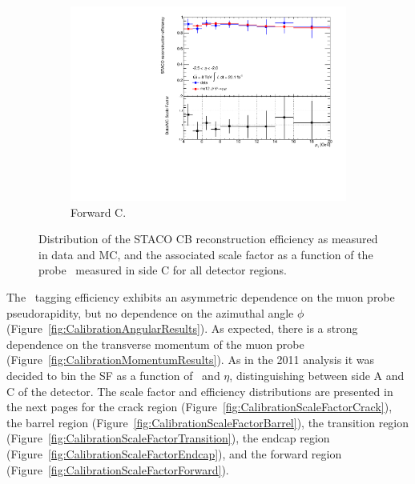 \begin{figure}[htbp]
    \begin{subfigure}[b]{0.45\textwidth}
      \includegraphics[width=\textwidth]{PartCalibration2012/Plots/SFPlots/Forward_C_reco.pdf}
      \caption{Forward C.}\label{fig:CalibrationRecoSFForwardC}
    \end{subfigure}
    \caption{Distribution of the STACO CB reconstruction efficiency as measured in data and MC, and the associated scale factor as a function of the probe \pt\ measured in side C for all detector regions.}\label{fig:RecoEffSideC}
\end{figure}

The \xsm\ tagging efficiency exhibits an asymmetric dependence on the muon probe pseudorapidity, but no dependence on the azimuthal angle $\phi$ (Figure~\ref{fig:CalibrationAngularResults}). As expected, there is a strong dependence on the transverse momentum of the muon probe (Figure~\ref{fig:CalibrationMomentumResults}). As in the 2011 analysis it was decided to bin the SF as a function of \pt\ and $\eta$, distinguishing between side A and C of the detector. The scale factor and efficiency distributions are presented in the next pages for the crack region (Figure~\ref{fig:CalibrationScaleFactorCrack}), the barrel region (Figure~\ref{fig:CalibrationScaleFactorBarrel}), the transition region (Figure~\ref{fig:CalibrationScaleFactorTransition}), the endcap region (Figure~\ref{fig:CalibrationScaleFactorEndcap}), and the forward region (Figure~\ref{fig:CalibrationScaleFactorForward}).

